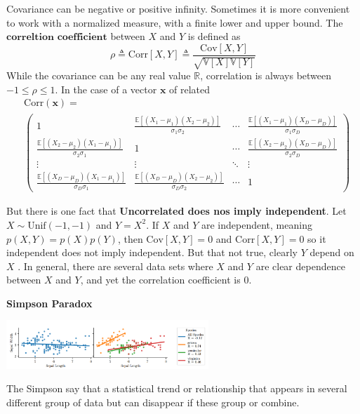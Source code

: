 \documentclass[10pt,landscape]{article}
\newcommand{\cov}{\textrm{Cov}}
\newcommand{\corr}{\textrm{Corr}}
\newcommand{\Unif}{\textrm{Unif}}
\newcommand{\var}{\mathbb{V}}
\newcommand{\inp}{\textbf{x}}
\newcommand{\R}{\mathbb{R}}
\begin{document}
\begin{multicols*}{3}
Covariance can be negative or positive infinity. Sometimes it is more convenient to work with a normalized measure, with a finite lower and upper bound. The $\textbf{correltion coefficient}$ between $X$ and $Y$ is defined as
\[
    \rho\triangleq\corr[X,Y]\triangleq\frac{\cov[X,Y]}{\sqrt{\var[X]\var[Y]}}
\]
While the covariance can be any real value $\R$, correlation is always between $-1\leq\rho\leq1$. In the case of a vector $\inp$ of related 
\begin{align*}
    & \corr(\inp)= \\ 
    &\begin{pmatrix}
    1 & \!\!\!\!\!\!\! \frac{\mathbb{E}[(X_1 - \mu_1)(X_2 - \mu_2)]}{\sigma_1 \sigma_2} & \!\!\!\!\!\!\! \cdots & \!\!\!\!\!\!\! \frac{\mathbb{E}[(X_1 - \mu_1)(X_D - \mu_D)]}{\sigma_1 \sigma_D} \\
    \frac{\mathbb{E}[(X_2 - \mu_2)(X_1 - \mu_1)]}{\sigma_2 \sigma_1} & \!\!\!\!\!\!\! 1 & \!\!\!\!\!\!\!\cdots & \!\!\!\!\!\!\!\frac{\mathbb{E}[(X_2 - \mu_2)(X_D - \mu_D)]}{\sigma_2 \sigma_D} \\
    \vdots &\!\!\!\!\!\!\! \vdots &\!\!\!\!\!\!\! \ddots & \!\!\!\!\!\!\!\vdots \\ 
    \frac{\mathbb{E}[(X_D - \mu_D)(X_1 - \mu_1)]}{\sigma_D \sigma_1} &\!\!\!\!\!\!\! \frac{\mathbb{E}[(X_D - \mu_D)(X_2 - \mu_2)]}{\sigma_D \sigma_2} & \!\!\!\!\!\!\!\cdots &\!\!\!\!\!\!\! 1
    \end{pmatrix}
\end{align*}

But there is one fact that \textbf{Uncorrelated does nos imply independent}. Let $X\sim\Unif(-1,-1)$ and $Y=X^2$. If $X$ and $Y$ are independent, meaning $p(X,Y)=p(X)p(Y)$, then $\cov[X,Y]=0$ and $\corr[X,Y]=0$ so it independent does not imply independent. But that not true, clearly $Y$ depend on $X$ . In general, there are several data sets where $X$ and $Y$ are clear dependence between $X$ and $Y$, and yet the correlation coefficient is $0$.

\textbf{Simpson Paradox}

\begin{minipage}{\linewidth}
    \centering
    \includegraphics[width=3in]{figures/SimpsonParadox.PNG}
\end{minipage}
The Simpson say that a statistical trend or relationship that appears in several different group of data but can disappear if these group or combine. 


\end{multicols*}
\end{document}
